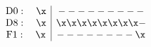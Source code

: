 \begin{equation}
\label{hw2}
 \begin{array}{c|c}
{\rm D0}:\ \ \          \x & -    -   -   -   -  -  - -    - \\
{\rm D8}:\ \ \          \x & \x   \x  \x  \x  \x  \x \x \x   -    \\
{\rm F1}: \ \ \       \x & - - - - - - - - \x  
                         \end{array} 
\end{equation}

